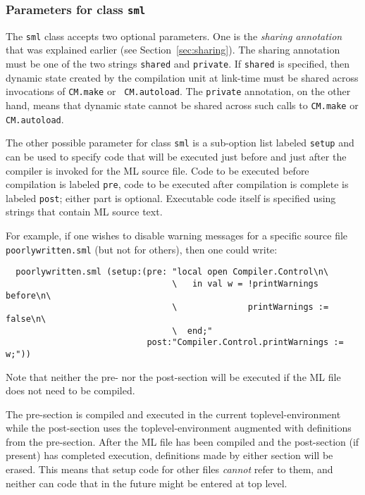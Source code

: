 \documentclass[titlepage,letterpaper]{article}
\begin{document}
\subsubsection*{Parameters for class {\tt sml}}

The {\tt sml} class accepts two optional parameters.  One is the {\em
sharing annotation} that was explained earlier (see
Section~\ref{sec:sharing}).  The sharing annotation must be one of the
two strings {\tt shared} and {\tt private}.  If {\tt shared} is
specified, then dynamic state created by the compilation unit at
link-time must be shared across invocations of {\tt CM.make} or {\tt
CM.autoload}.  The {\tt private} annotation, on the other hand, means
that dynamic state cannot be shared across such calls to {\tt CM.make}
or {\tt CM.autoload}.

The other possible parameter for class {\tt sml} is a sub-option
list labeled {\tt setup} and can be used to specify code that will be
executed just before and just after the compiler is invoked for the
ML source file.  Code to be executed before compilation is labeled
{\tt pre}, code to be executed after compilation is complete is
labeled {\tt post}; either part is optional.  Executable code itself
is specified using strings that contain ML source text.

For example, if one wishes to disable warning messages for a specific
source file {\tt poorlywritten.sml} (but not for others), then one
could write:

\begin{verbatim}
  poorlywritten.sml (setup:(pre: "local open Compiler.Control\n\
                                 \   in val w = !printWarnings before\n\
                                 \              printWarnings := false\n\
                                 \  end;"
                            post:"Compiler.Control.printWarnings := w;"))
\end{verbatim}

\noindent Note that neither the pre- nor the post-section will be
executed if the ML file does not need to be compiled.

The pre-section is compiled and executed in the current
toplevel-environment while the post-section uses the
toplevel-environment augmented with definitions from the pre-section.
After the ML file has been compiled and the post-section (if present)
has completed execution, definitions made by either section will be
erased.  This means that setup code for other files {\em cannot} refer
to them, and neither can code that in the future might be entered at
top level.
\end{document}
